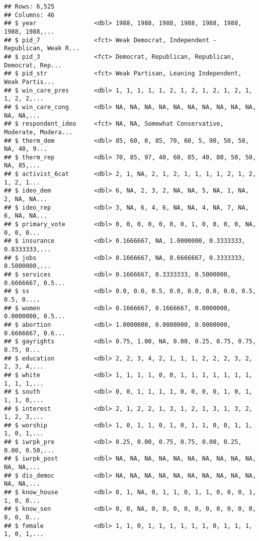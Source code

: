 \documentclass[
]{article}
\begin{document}
\begin{verbatim}
## Rows: 6,525
## Columns: 46
## $ year                <dbl> 1988, 1988, 1988, 1988, 1988, 1988, 1988, 1988,...
## $ pid_7               <fct> Weak Democrat, Independent - Republican, Weak R...
## $ pid_3               <fct> Democrat, Republican, Republican, Democrat, Rep...
## $ pid_str             <fct> Weak Partisan, Leaning Independent, Weak Partis...
## $ win_care_pres       <dbl> 1, 1, 1, 1, 1, 2, 1, 2, 1, 2, 1, 2, 1, 1, 2, 2,...
## $ win_care_cong       <dbl> NA, NA, NA, NA, NA, NA, NA, NA, NA, NA, NA, NA,...
## $ respondent_ideo     <fct> NA, NA, Somewhat Conservative, Moderate, Modera...
## $ therm_dem           <dbl> 85, 60, 0, 85, 70, 60, 5, 90, 50, 50, NA, 40, 9...
## $ therm_rep           <dbl> 70, 85, 97, 40, 60, 85, 40, 80, 50, 50, NA, 85,...
## $ activist_6cat       <dbl> 2, 1, NA, 2, 1, 2, 1, 1, 1, 1, 2, 1, 2, 1, 2, 1...
## $ ideo_dem            <dbl> 6, NA, 2, 3, 2, NA, NA, 5, NA, 1, NA, 2, NA, NA...
## $ ideo_rep            <dbl> 3, NA, 6, 4, 6, NA, NA, 4, NA, 7, NA, 6, NA, NA...
## $ primary_vote        <dbl> 0, 0, 0, 0, 0, 0, 0, 1, 0, 0, 0, 0, NA, 0, 0, 0...
## $ insurance           <dbl> 0.1666667, NA, 1.0000000, 0.3333333, 0.8333333,...
## $ jobs                <dbl> 0.1666667, NA, 0.6666667, 0.3333333, 0.5000000,...
## $ services            <dbl> 0.1666667, 0.3333333, 0.5000000, 0.6666667, 0.5...
## $ ss                  <dbl> 0.0, 0.0, 0.5, 0.0, 0.0, 0.0, 0.0, 0.5, 0.5, 0....
## $ women               <dbl> 0.1666667, 0.1666667, 0.0000000, 0.0000000, 0.5...
## $ abortion            <dbl> 1.0000000, 0.0000000, 0.0000000, 0.6666667, 0.6...
## $ gayrights           <dbl> 0.75, 1.00, NA, 0.00, 0.25, 0.75, 0.75, 0.75, 0...
## $ education           <dbl> 2, 2, 3, 4, 2, 1, 1, 1, 2, 2, 2, 3, 2, 2, 3, 4,...
## $ white               <dbl> 1, 1, 1, 1, 0, 0, 1, 1, 1, 1, 1, 1, 1, 1, 1, 1,...
## $ south               <dbl> 0, 0, 1, 1, 1, 1, 0, 0, 0, 0, 1, 0, 1, 1, 1, 0,...
## $ interest            <dbl> 2, 1, 2, 2, 1, 3, 1, 2, 1, 3, 1, 3, 2, 1, 2, 3,...
## $ worship             <dbl> 1, 0, 1, 1, 0, 1, 0, 1, 1, 0, 0, 1, 1, 1, 0, 1,...
## $ iwrpk_pre           <dbl> 0.25, 0.00, 0.75, 0.75, 0.00, 0.25, 0.00, 0.50,...
## $ iwrpk_post          <dbl> NA, NA, NA, NA, NA, NA, NA, NA, NA, NA, NA, NA,...
## $ dis_democ           <dbl> NA, NA, NA, NA, NA, NA, NA, NA, NA, NA, NA, NA,...
## $ know_house          <dbl> 0, 1, NA, 0, 1, 1, 0, 1, 1, 0, 0, 0, 1, 1, 0, 0...
## $ know_sen            <dbl> 0, 0, NA, 0, 0, 0, 0, 0, 0, 0, 0, 0, 0, 0, 0, 0...
## $ female              <dbl> 1, 1, 0, 1, 1, 1, 1, 1, 1, 0, 1, 1, 1, 1, 0, 1,...

\end{verbatim}
\end{document}
